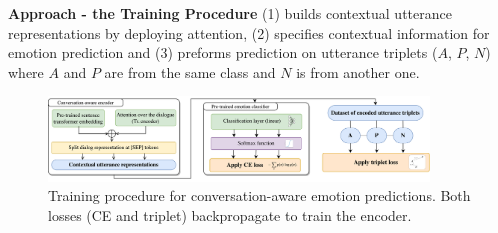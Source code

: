 \documentclass[final,hyperref={pdfpagelabels=false},unknownkeysallowed]{beamer} %
\begin{document}
\begin{frame}
\begin{block}{\textbf{Approach - the Training Procedure}}
 (1) builds contextual utterance representations by deploying attention, (2) specifies contextual information for emotion prediction and (3) preforms prediction on utterance triplets ($A$, $P$, $N$) where $A$ and $P$ are from the same class and $N$ is from another one.
\begin{figure}
  \centering
  \includegraphics[width=0.9\textwidth]{images/contextual_utterances_training_veryFlat.png}
  \caption{Training procedure for conversation-aware emotion predictions. Both losses (CE and triplet) backpropagate to train the encoder.}
\end{figure}
\vspace{-1ex}
\end{block}


\end{frame}
\end{document}

